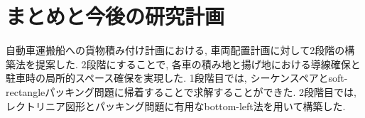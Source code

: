 \chapter{まとめと今後の研究計画}\label{conclution}
自動車運搬船への貨物積み付け計画における, 車両配置計画に対して2段階の構築法を提案した. 
2段階にすることで, 各車の積み地と揚げ地における導線確保と駐車時の局所的スペース確保を実現した. 
1段階目では, シーケンスペアとsoft-rectangleパッキング問題に帰着することで求解することができた. 
2段階目では, レクトリニア図形とパッキング問題に有用なbottom-left法を用いて構築した. 
